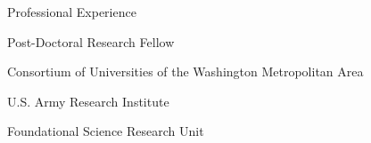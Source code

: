 
\begin{rubric}{Professional Experience}


	

	Post-Doctoral Research Fellow\par
	Consortium of Universities of the Washington Metropolitan Area\par
	U.S. Army Research Institute\par
	Foundational Science Research Unit
	

	
\end{rubric}
